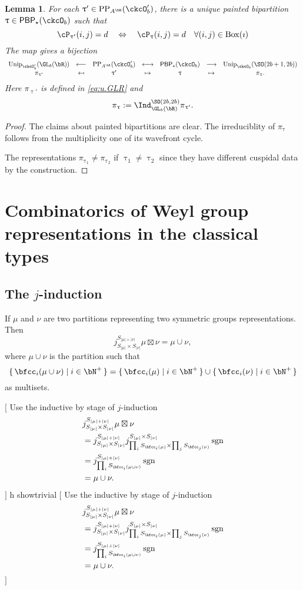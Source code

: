 \documentclass[12pt,a4paper]{amsart}
\newcommand{\trivial}[2][]{\if\relax\detokenize{#1}\relax
  {%
      \color{orange} \vspace{0em} $[$  #2 $]$
      \color{black}
  }
  \else
\ifx#1h
\ifcsname showtrivial\endcsname
{%
    \color{orange} \vspace{0em}  $[$ #2 $]$
    \color{black}
}
\fi
\else {\red Wrong argument!} \fi
\fi
}
\def\abs#1{\left|{#1}\right|}
\newcommand{\sgn}{\operatorname{sgn}}
\numberwithin{equation}{section}
\newtheorem{lem}[thm]{Lemma}
\theoremstyle{remark}
\def\Unip{\mathrm{Unip}}
\def\PP{\mathrm{PP}}
\def\BOX#1{\mathrm{Box}(#1)}
\providecommand\mapsfrom{\scalebox{-1}[1]{$\mapsto$}}
\begin{document}
\begin{lem}
  For each $\uptau' \in \PP_{A^{\bR}}(\ckcO'_{b})$, there is a unique painted
  bipartition $\uptau\in \PBP_{\star}(\ckcO_{b})$ such that
  \[
    \cP_{\uptau'}(i,j) = d \quad %
    \Leftrightarrow
    \quad
    \cP_{\uptau}(i,j) = d \quad \forall (i,j)\in \BOX{\imath}\\
  \]
  The map gives a bijection
  \[
    \begin{array}{ccccccc}
      \Unip_{\ckcO'_{b}}(\GL_{b}(\bR))&\longleftarrow
      &\PP_{A^{\bR}}(\ckcO'_{b}) & \longleftrightarrow
      & \PBP_{\star}(\ckcO_{b}) & \longrightarrow
      & \Unip_{\ckcO_{b}}(\SO(2b+1,2b))\\
      \pi_{\uptau'} & \mapsfrom & \uptau' & \mapsto
      & \uptau & \mapsto & \pi_{\uptau}.
    \end{array}
  \]
  Here $\pi_{\uptau'}$ is defined in \eqref{eq:u.GLR} and
  \[
    \pi_{\uptau} := \Ind_{\GL_{b}(\bR)}^{\SO(2b,2b)} \pi_{\uptau'}.
  \]
\end{lem}
\begin{proof}
  The claims about painted bipartitions are clear.
  The irreduciblity of $\pi_{\uptau}$ follows from the multiplicity one
  of its wavefront cycle.

  The representations $\pi_{\uptau_{1}}\neq \pi_{\uptau_{2}}$ if
  $\uptau_{1}\neq \uptau_{2}$ since they have different cuspidal data by the
  construction.
\end{proof}


\appendix
\section{Combinatorics of Weyl group representations in the classical types}

\subsection{The $j$-induction}
If $\mu$ and $\nu$ are two partitions representing two symmetric groups
representations.
Then
\[
  j_{S_{\abs{\mu}}\times S_{\abs{\nu}}}^{S_{\abs{\mu}+\abs{\nu}}}
  \mu\boxtimes \nu
  = \mu\cup \nu,
\]
where $\mu\cup \nu$ is the partition such that
\[
  \set{\bfcc_{i}(\mu\cup\nu) | i\in \bN^{+}} =
  \set{\bfcc_{i}(\mu) | i\in \bN^{+}}
  \cup
  \set{\bfcc_{i}(\nu) | i\in \bN^{+}}
\]
as multisets.

\trivial{
Use the inductive by stage of $j$-induction
\[
  \begin{split}
  &j_{S_{\abs{\mu}}\times S_{\abs{\nu}}}^{S_{\abs{\mu}+\abs{\nu}}}
  \mu\boxtimes \nu\\
  &=
j_{S_{\abs{\mu}}\times S_{\abs{\nu}}}^{S_{\abs{\mu}+\abs{\nu}}}
j^{S_{\abs{\mu}}\times S_{\abs{\nu}}}_{\prod_{i}S_{\bfcc_{i}(\mu)}\times
  \prod_{j} S_{\bfcc_{j}(\nu)}}\sgn\\
 &=
j^{S_{\abs{\mu}+\abs{\nu}}}_{\prod_{i}S_{\bfcc_{i}(\mu\cup \nu)}}\sgn\\
  &= \mu\cup \nu.
  \end{split}
\]
}
\end{document}
